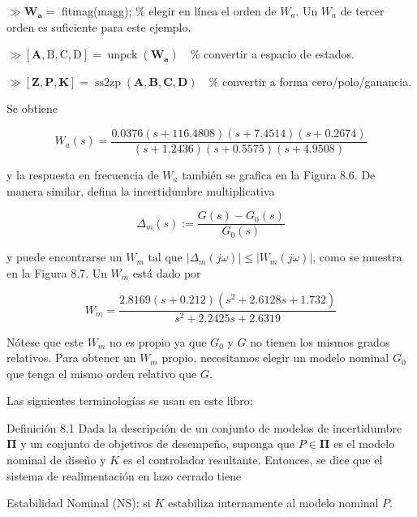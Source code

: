 $\gg \mathbf{W}_{\mathbf{a}}=$ fitmag(magg); \% elegir en línea el orden de $W_{a}$. Un $W_{a}$ de tercer orden es suficiente para este ejemplo.

$\gg[\mathbf{A}, \mathrm{B}, \mathrm{C}, \mathrm{D}]=\operatorname{unpck}\left(\mathbf{W}_{\mathbf{a}}\right) \quad \%$ convertir a espacio de estados.

$\gg[\mathbf{Z}, \mathbf{P}, \mathbf{K}]=\operatorname{ss2zp}(\mathbf{A}, \mathbf{B}, \mathbf{C}, \mathbf{D}) \quad \%$ convertir a forma cero/polo/ganancia.

Se obtiene

$$
W_{a}(s)=\frac{0.0376(s+116.4808)(s+7.4514)(s+0.2674)}{(s+1.2436)(s+0.5575)(s+4.9508)}
$$

y la respuesta en frecuencia de $W_{a}$ también se grafica en la Figura 8.6. De manera similar, defina la incertidumbre multiplicativa

$$
\Delta_{m}(s):=\frac{G(s)-G_{0}(s)}{G_{0}(s)}
$$

y puede encontrarse un $W_{m}$ tal que $\left|\Delta_{m}(j \omega)\right| \leq\left|W_{m}(j \omega)\right|$, como se muestra en la Figura 8.7. Un $W_{m}$ está dado por

$$
W_{m}=\frac{2.8169(s+0.212)\left(s^{2}+2.6128 s+1.732\right)}{s^{2}+2.2425 s+2.6319}
$$



Nótese que este $W_{m}$ no es propio ya que $G_{0}$ y $G$ no tienen los mismos grados relativos. Para obtener un $W_{m}$ propio, necesitamos elegir un modelo nominal $G_{0}$ que tenga el mismo orden relativo que $G$.

Las siguientes terminologías se usan en este libro:

Definición 8.1 Dada la descripción de un conjunto de modelos de incertidumbre $\boldsymbol{\Pi}$ y un conjunto de objetivos de desempeño, suponga que $P \in \boldsymbol{\Pi}$ es el modelo nominal de diseño y $K$ es el controlador resultante. Entonces, se dice que el sistema de realimentación en lazo cerrado tiene

Estabilidad Nominal (NS): si $K$ estabiliza internamente al modelo nominal $P$.

